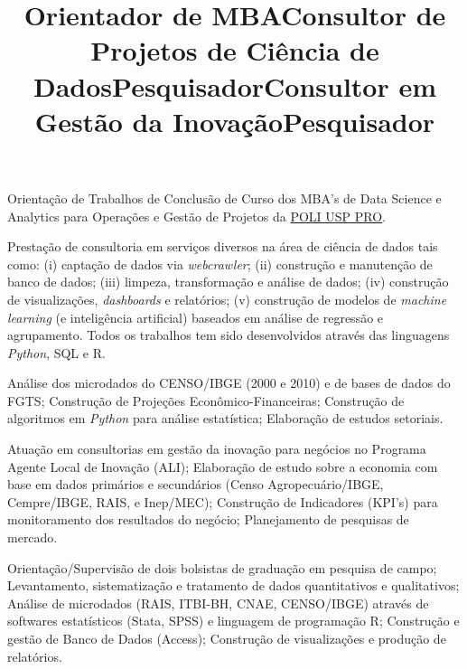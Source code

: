 \documentclass[margin]{res}
\begin{document}
\begin{resume}
\title{\textbf{Orientador de MBA}}
\begin{position}
Orientação de Trabalhos de Conclusão de Curso dos MBA's de Data Science e Analytics para Operações e Gestão de Projetos da \href{https://poliusppro.com/}{POLI USP PRO}. 

\end{position}


\title{\textbf{Consultor de Projetos de Ciência de Dados}}
\begin{position}
Prestação de consultoria em serviços diversos na área de ciência de dados tais como: (i) captação de dados via \textit{webcrawler}; (ii) construção e manutenção de banco de dados; (iii) limpeza, transformação e análise de dados; (iv) construção de visualizações, \textit{dashboards} e relatórios; (v) construção de modelos de \textit{machine learning} (e inteligência artificial) baseados em análise de regressão e agrupamento. 
Todos os trabalhos tem sido desenvolvidos através das linguagens \textit{Python}, SQL e R.
\end{position}


\title{\textbf{Pesquisador}}
\begin{position}
Análise dos microdados do CENSO/IBGE (2000 e 2010) e de bases de dados do FGTS; Construção de Projeções Econômico-Financeiras; Construção de algoritmos em \textit{Python} para análise estatística; Elaboração de estudos setoriais. 
\end{position}

\title{\textbf{Consultor em Gestão da Inovação}}
\begin{position}
Atuação em consultorias em gestão da inovação para negócios  no Programa Agente Local de Inovação (ALI); Elaboração de estudo sobre a economia com base em dados primários e secundários (Censo Agropecuário/IBGE, Cempre/IBGE, RAIS, e Inep/MEC); Construção de Indicadores (KPI’s) para monitoramento dos resultados do negócio; Planejamento de pesquisas de mercado.
\end{position}

\title{\textbf{Pesquisador}}
\begin{position}
Orientação/Supervisão de dois bolsistas de graduação em pesquisa de campo; Levantamento, sistematização e tratamento de dados quantitativos e qualitativos; Análise de microdados (RAIS, ITBI-BH, CNAE, CENSO/IBGE) através de softwares estatísticos (Stata, SPSS) e linguagem de programação R; Construção e gestão de Banco de Dados (Access); Construção de visualizações e produção de relatórios.
\end{position}


\end{resume}
\end{document}
